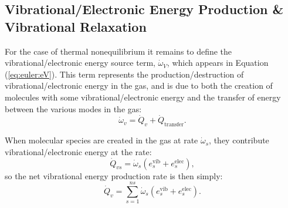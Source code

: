 \documentclass[10pt]{article}
\begin{document}
\subsection{Vibrational/Electronic Energy Production \& Vibrational Relaxation}\label{sec:omega_v}

For the case of thermal nonequilibrium it remains to define the vibrational/electronic energy source term, $\dot{\omega}_V$, which appears in Equation (\ref{eq:euler:eV}).  This term represents the production/destruction of vibrational/electronic energy in the gas, and is due to both the creation of molecules with some vibrational/electronic energy and the transfer of energy between the various modes in the gas:
\begin{equation}
  \dot{\omega}_v = \dot{Q}_{v} + \dot{Q}_{\text{transfer}}.
\end{equation}

When molecular species are created in the gas at rate $\dot{\omega}_s$, they contribute vibrational/electronic energy at the rate: 
\begin{equation*}
  \dot{Q}_{vs}=\dot{\omega}_s\left(e^{\text{vib}}_{s} + e^{\text{elec}}_{s}\right),
\end{equation*}
so the net vibrational energy production rate is then simply:
\begin{equation}
  \label{eq:vibrational_energy_production}
  \dot{Q}_{v} = \sum_{s=1}^{ns} \dot{\omega}_s\left(e^{\text{vib}}_{s} + e^{\text{elec}}_{s}\right).
\end{equation}
\end{document}
